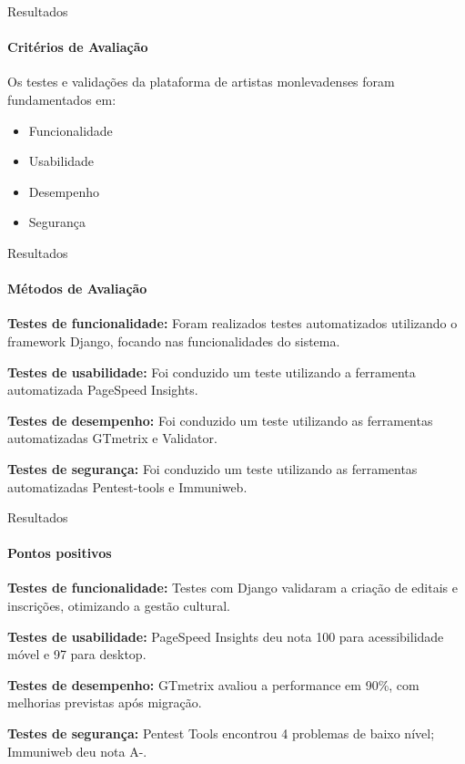 \begin{frame}{Resultados}
\framesubtitle{Critérios de Avaliação}

Os testes e validações da plataforma de artistas monlevadenses foram fundamentados em:

    \vspace{\baselineskip}
    
    \begin{itemize}
        \item Funcionalidade
        \item Usabilidade 
        \item Desempenho
        \item Segurança
    \end{itemize}
    
\end{frame}
    
\begin{frame}{Resultados}
\framesubtitle{Métodos de Avaliação}

\textbf{Testes de funcionalidade:} Foram realizados testes automatizados utilizando o framework Django, focando nas
funcionalidades do sistema.

\vspace{\baselineskip}
\textbf{Testes de usabilidade:} Foi conduzido um teste utilizando a ferramenta automatizada PageSpeed
Insights.

\vspace{\baselineskip}
\textbf{Testes de desempenho:} Foi conduzido um teste utilizando as ferramentas automatizadas GTmetrix e Validator.

\vspace{\baselineskip}
\textbf{Testes de segurança:} Foi conduzido um teste utilizando as ferramentas automatizadas Pentest-tools e Immuniweb.
    
\end{frame}

\begin{frame}{Resultados}
    \framesubtitle{Pontos positivos}
    
    \textbf{Testes de funcionalidade:} Testes com Django validaram a criação de editais e inscrições, otimizando a gestão cultural.
    
    \vspace{\baselineskip}
    \textbf{Testes de usabilidade:} PageSpeed Insights deu nota 100 para acessibilidade móvel e 97 para desktop.
    
    \vspace{\baselineskip}
    \textbf{Testes de desempenho:} GTmetrix avaliou a performance em 90\%, com melhorias previstas após migração.
    
    \vspace{\baselineskip}
    \textbf{Testes de segurança:} Pentest Tools encontrou 4 problemas de baixo nível; Immuniweb deu nota A-.
    
\end{frame}

